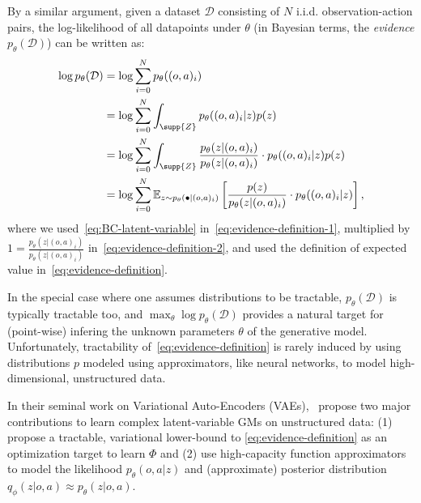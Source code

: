By a similar argument, given a dataset \( \mathcal D \) consisting of \( N \) i.i.d. observation-action pairs, the log-likelihood of all datapoints under \( \theta \) (in Bayesian terms, the \emph{evidence} \( p_\theta(\mathcal D)\)) can be written as:
\begin{align}
    \log p_\theta(\mathcal D) &= \log \sum_{i=0}^N p_\theta ((o,a)_i) \label{eq:evidence-definition-1}\\
                              &= \log \sum_{i=0}^N \int_{\supp{Z}} p_\theta((o,a)_i \vert z) p(z) \label{eq:evidence-definition-2}\\
                              &= \log \sum_{i=0}^N \int_{\supp{Z}} \frac{p_\theta(z \vert (o,a)_i)}{p_\theta(z \vert (o,a)_i)} \cdot p_\theta((o,a)_i \vert z) p(z) \label{eq:evidence-definition-3}\\
                              &= \log \sum_{i=0}^N \mathbb E_{z \sim p_\theta(\bullet \vert (o,a)_i)} \left[ \frac{p(z)}{p_\theta(z \vert (o,a)_i)} \cdot p_\theta((o,a)_i \vert z) \right], \label{eq:evidence-definition}
\end{align}
where we used~\ref{eq:BC-latent-variable} in~\ref{eq:evidence-definition-1}, multiplied by \(1 = \frac{p_\theta(z \vert (o,a)_i)}{p_\theta(z \vert (o,a)_i)} \) in~\ref{eq:evidence-definition-2}, and used the definition of expected value in~\ref{eq:evidence-definition}.

In the special case where one assumes distributions to be tractable, \( p_\theta (\mathcal D) \) is typically tractable too, and \(\max_\theta \log p_\theta(\mathcal D) \) provides a natural target for (point-wise) infering the unknown parameters \( \theta \) of the generative model.
Unfortunately, tractability of~\ref{eq:evidence-definition} is rarely induced by using distributions \( p \) modeled using approximators, like neural networks, to model high-dimensional, unstructured data.

In their seminal work on Variational Auto-Encoders (VAEs),~\citet{kingmaAutoEncodingVariationalBayes2022} propose two major contributions to learn complex latent-variable GMs on unstructured data: (1) propose a tractable, variational lower-bound to \ref{eq:evidence-definition} as an optimization target to learn \( \Phi \) and (2) use high-capacity function approximators to model the likelihood \(p_\theta(o,a\vert z)\) and (approximate) posterior distribution \( q_\phi(z \vert o,a) \approx p_\theta(z \vert o,a) \).

